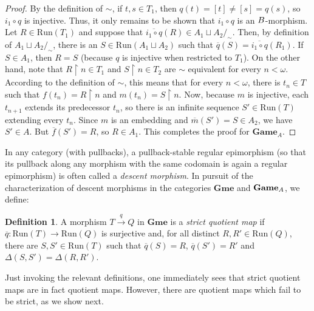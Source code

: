 \documentclass[12pt]{amsart}
\theoremstyle{definition}
\newtheorem{defn}[thm]{Definition}
\newcommand{\A}{\textup{\textmd{\textsc{A}}}}
\newcommand{\B}{\textup{\textmd{\textsc{B}}}}
\newcommand{\Run}{{\mathrm{Run}}}
\DeclareMathOperator{\restrict}{\upharpoonright}
\newcommand{\Games}{\mathbf{Game}}
\newcommand{\Gmes}{\mathbf{Gme}}
\begin{document}
\begin{proof}
	By the definition of $\sim$, if $t,s\in T_1$, then $q(t)=[t]\neq [s]=q(s)$, so $i_1\circ q$ is injective. Thus, it only remains to be shown that $i_1\circ q$ is an $\B$-morphism.
	Let $R\in \Run(T_1)$ and suppose that $\overline{i_1\circ q}(R)\in A_1\sqcup A_2/_\sim$. Then, by definition of $A_1\sqcup A_2/_\sim$, there is an $S\in \Run(A_1\sqcup A_2)$ such that $\overline{q}(S)=\overline{i_1\circ q}(R_1)$. If $S\in A_1$, then $R=S$ (because $q$ is injective when restricted to $T_1$). On the other hand, note that $R\restrict n\in T_1$ and $S\restrict n\in T_2$ are $\sim$ equivalent for every $n<\omega$. According to the definition of $\sim$, this means that for every $n<\omega$, there is $t_n\in T$ such that $f(t_n)=R\restrict n$ and $m(t_n)=S\restrict n$. Now, because $m$ is injective, each $t_{n+1}$ extends its predecessor $t_n$, so there is an infinite sequence $S'\in \Run(T)$ extending every $t_n$. Since $m$ is an embedding and $\overline{m}(S') = S\in A_2$, we have $S'\in A$. But $\overline{f}(S')=R$, so $R\in A_1$. This completes the proof for $\Games_{A}$.
\end{proof}

In any category (with pullbacks), a pullback-stable regular epimorphism (so that its pullback along any morphism with the same codomain is again a regular epimorphism) is often called a {\em descent morphism}. In pursuit of the characterization of descent morphisms in the categories $\Gmes$ and $\Games_{\A}$, we define:  

\begin{defn}
	A morphism $T\stackrel{q}{\to}Q$ in $\Gmes$ is a {\em  strict quotient map} 
	if $\overline{q}\colon \Run(T)\to \Run(Q)$ is surjective and, for all distinct $R,R'\in \Run(Q)$, there are $S,S'\in \Run(T)$ such that $\overline{q}(S)=R$, $\overline{q}(S') = R'$ and $\Delta(S,S') = \Delta(R,R')$.	
\end{defn}

Just invoking the relevant definitions, one immediately sees that strict quotient maps are in fact quotient maps. However, there are quotient maps which fail to be strict, as we show next.
\end{document}
